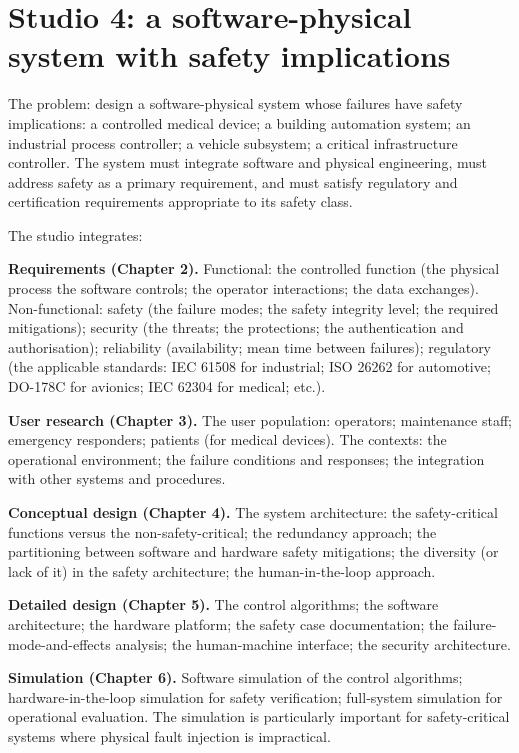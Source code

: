 \section{Studio 4: a software-physical system with safety implications}

The problem: design a software-physical system whose failures have safety implications: a controlled medical device; a building automation system; an industrial process controller; a vehicle subsystem; a critical infrastructure controller. The system must integrate software and physical engineering, must address safety as a primary requirement, and must satisfy regulatory and certification requirements appropriate to its safety class.

The studio integrates:

\textbf{Requirements (Chapter 2).} Functional: the controlled function (the physical process the software controls; the operator interactions; the data exchanges). Non-functional: safety (the failure modes; the safety integrity level; the required mitigations); security (the threats; the protections; the authentication and authorisation); reliability (availability; mean time between failures); regulatory (the applicable standards: IEC 61508 for industrial; ISO 26262 for automotive; DO-178C for avionics; IEC 62304 for medical; etc.).

\textbf{User research (Chapter 3).} The user population: operators; maintenance staff; emergency responders; patients (for medical devices). The contexts: the operational environment; the failure conditions and responses; the integration with other systems and procedures.

\textbf{Conceptual design (Chapter 4).} The system architecture: the safety-critical functions versus the non-safety-critical; the redundancy approach; the partitioning between software and hardware safety mitigations; the diversity (or lack of it) in the safety architecture; the human-in-the-loop approach.

\textbf{Detailed design (Chapter 5).} The control algorithms; the software architecture; the hardware platform; the safety case documentation; the failure-mode-and-effects analysis; the human-machine interface; the security architecture.

\textbf{Simulation (Chapter 6).} Software simulation of the control algorithms; hardware-in-the-loop simulation for safety verification; full-system simulation for operational evaluation. The simulation is particularly important for safety-critical systems where physical fault injection is impractical.

